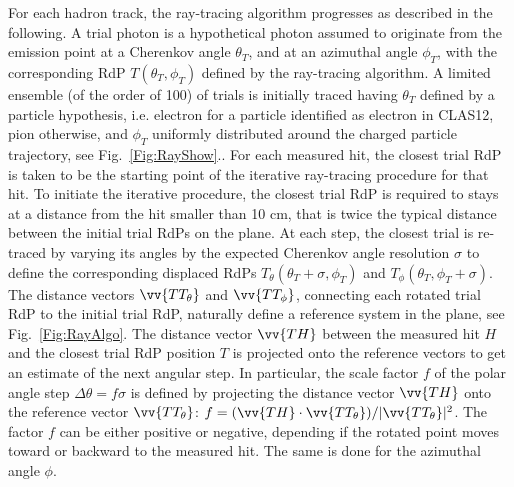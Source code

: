 For each hadron track, the ray-tracing algorithm progresses as described in the following. A trial photon is a hypothetical photon assumed to originate from the emission point at a Cherenkov angle $\theta_T$, and at an azimuthal angle $\phi_T$, with the corresponding RdP $T(\theta_T, \phi_T)$ defined by the ray-tracing algorithm. A limited ensemble (of the order of 100) of trials is initially traced having $\theta_T$ defined by a particle hypothesis, i.e. electron for a particle identified as electron in CLAS12, pion otherwise, and $\phi_T$ uniformly distributed around the charged particle trajectory, see Fig.~\ref{Fig:RayShow}.. For each \MaPMT measured hit, the closest trial RdP is taken to be the starting point of the iterative ray-tracing procedure for that hit. To initiate the iterative procedure, the closest trial RdP is required to stays at a distance from the hit smaller than 10 cm, that is twice the typical distance between the initial trial RdPs on the \MaPMT plane.
 At each step, the closest trial is re-traced by varying its angles by the expected Cherenkov angle resolution $\sigma$ to define the corresponding displaced RdPs $T_{\theta} (\theta_T + \sigma, \phi_T)$ and $T_{\phi}(\theta_T, \phi_T + \sigma)$. The distance vectors $\vv{TT_\theta}$ and $\vv{TT_\phi}$, connecting each rotated trial RdP to the initial trial RdP, naturally define a reference system in the \MaPMT plane, see Fig.~\ref{Fig:RayAlgo}. The distance vector $\vv{TH}$ between the measured hit $H$ and the closest trial RdP position $T$ is projected onto the reference vectors to get an estimate of the next angular step. In particular, the scale factor $f$ of the polar angle step $\Delta \theta = f \sigma$ is defined by projecting the distance vector $\vv{TH}$ onto the reference vector $\vv{TT_\theta}$: $f=(\vv{TH}\cdot \vv{TT_\theta}) / |\vv{TT_\theta}|^2$. The factor $f$ can be either positive or negative, depending if the rotated point moves toward or backward to the measured hit.  The same is done for the azimuthal angle $\phi$. 

